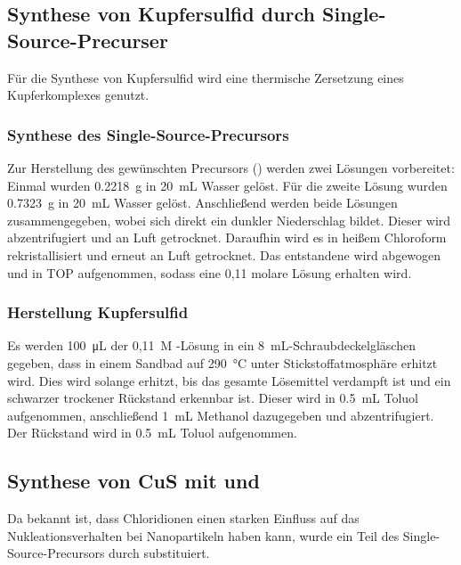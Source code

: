 	\subsection{Synthese von Kupfersulfid durch Single-Source-Precurser}
	    Für die Synthese von Kupfersulfid wird eine thermische Zersetzung eines Kupferkomplexes genutzt. \autocite{JenLaPlante2010}
		\subsubsection{Synthese des Single-Source-Precursors }
	        Zur Herstellung des gewünschten Precursors () werden zwei Lösungen vorbereitet: 
    	    Einmal wurden \SI{0,2218}{\gram}  in \SI{20}{\milli\liter} Wasser gelöst.
	        Für die zweite Lösung wurden \SI{0,7323}{\gram}  in \SI{20}{\milli\liter} Wasser gelöst.
	        Anschließend werden beide Lösungen zusammengegeben, wobei sich direkt ein dunkler Niederschlag bildet.
	        Dieser wird abzentrifugiert und an Luft getrocknet.
	        Daraufhin wird es in heißem Chloroform rekristallisiert und erneut an Luft getrocknet.
		    Das entstandene  wird abgewogen und in TOP aufgenommen, sodass eine 0,11 molare Lösung erhalten wird.
		    
		\subsubsection{Herstellung Kupfersulfid}
		    Es werden \SI{100}{\micro\liter} der 0,11~M -Lösung in ein \SI{8}{\milli\liter}-Schraubdeckelgläschen gegeben, dass in einem Sandbad auf \SI{290}{\degreeCelsius} unter Stickstoffatmosphäre erhitzt wird.
		    Dies wird solange erhitzt, bis das gesamte Lösemittel verdampft ist und ein schwarzer trockener Rückstand erkennbar ist.
		    Dieser wird in \SI{0,5}{\milli\liter} Toluol aufgenommen, anschließend \SI{1}{\milli\liter} Methanol dazugegeben und abzentrifugiert.
		    Der Rückstand wird in \SI{0,5}{\milli\liter} Toluol aufgenommen.
	
	\subsection{Synthese von CuS mit  und }
	    Da bekannt ist, dass Chloridionen einen starken Einfluss auf das Nukleationsverhalten bei Nanopartikeln haben kann\cite{Hinrichs2016}, wurde ein Teil des Single-Source-Precursors durch  substituiert.
	    
